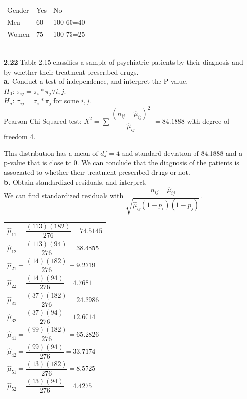 \documentclass[paper=letter, fontsize=11pt]{scrartcl} %
\begin{document}
\begin{tabular}{lll}
Gender & Yes & No        \\
Men    & 60  & 100-60=40 \\
Women  & 75  & 100-75=25 \\
\end{tabular}
\\

\textbf{2.22} Table 2.15 classifies a sample of psychiatric patients by their diagnosis
and by whether their treatment prescribed drugs. \\

\textbf{a.} Conduct a test of independence, and interpret the P-value. \\

$H_0$: $\pi_{ij} = \pi_i * \pi_j \forall i, j$. \\
$H_a$: $\pi_{ij} = \pi_i * \pi_j$ for some $i, j$. \\
Pearson Chi-Squared test: $X^2 = \sum \dfrac{(n_{ij} - \hat{\mu}_{ij})^2}{\hat{\mu}_{ij}}$
$ = 84.1888$ with degree of freedom 4.

This distribution has a mean of $df = 4$ and standard deviation of 84.1888 and a p-value that is close to 0. We can conclude that the diagnosis of the patients is associated to whether their treatment prescribed drugs or not. \\

\textbf{b.} Obtain standardized residuals, and interpret. \\

We can find standardized residuals with $\dfrac{n_{ij}-\hat{\mu}_{ij}}{\sqrt{\hat{\mu}_{ij}(1-p_i)(1-p_j)}}$.

\begin{tabular}{l}
$\hat{\mu}_{11} = \dfrac{(113)(182)}{276}=74.5145$ \\
$\hat{\mu}_{12} = \dfrac{(113)(94)}{276}=38.4855$  \\
$\hat{\mu}_{21} = \dfrac{(14)(182)}{276}=9.2319$   \\
$\hat{\mu}_{22} = \dfrac{(14)(94)}{276}=4.7681$    \\
$\hat{\mu}_{31} = \dfrac{(37)(182)}{276}=24.3986$  \\
$\hat{\mu}_{32} = \dfrac{(37)(94)}{276}=12.6014$   \\
$\hat{\mu}_{41} = \dfrac{(99)(182)}{276}=65.2826$  \\
$\hat{\mu}_{42} = \dfrac{(99)(94)}{276}=33.7174$   \\
$\hat{\mu}_{51} = \dfrac{(13)(182)}{276}=8.5725$   \\
$\hat{\mu}_{52} = \dfrac{(13)(94)}{276}=4.4275$   
\end{tabular}
\\
\end{document}
